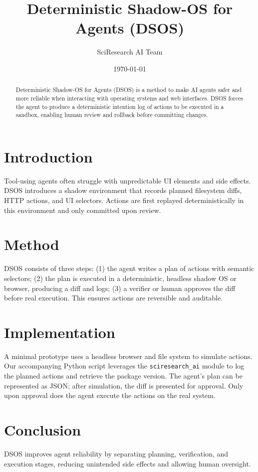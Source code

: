 \documentclass{article}
\title{Deterministic Shadow-OS for Agents (DSOS)}
\author{SciResearch AI Team}
\date{\today}
\begin{document}
\maketitle
\begin{abstract}
Deterministic Shadow-OS for Agents (DSOS) is a method to make AI agents
safer and more reliable when interacting with operating systems and web
interfaces. DSOS forces the agent to produce a deterministic intention
log of actions to be executed in a sandbox, enabling human review and
rollback before committing changes.
\end{abstract}
\section{Introduction}
Tool-using agents often struggle with unpredictable UI elements and
side effects. DSOS introduces a shadow environment that records planned
filesystem diffs, HTTP actions, and UI selectors. Actions are first
replayed deterministically in this environment and only committed upon
review.
\section{Method}
DSOS consists of three steps: (1) the agent writes a plan of actions
with semantic selectors; (2) the plan is executed in a deterministic,
headless shadow OS or browser, producing a diff and logs; (3) a
verifier or human approves the diff before real execution. This
ensures actions are reversible and auditable.
\section{Implementation}
A minimal prototype uses a headless browser and file system to
simulate actions. Our accompanying Python script leverages the
\texttt{sciresearch\_ai} module to log the planned actions and
retrieve the package version. The agent's plan can be represented as
JSON; after simulation, the diff is presented for approval. Only upon
approval does the agent execute the actions on the real system.
\section{Conclusion}
DSOS improves agent reliability by separating planning, verification,
and execution stages, reducing unintended side effects and allowing
human oversight.
\end{document}
